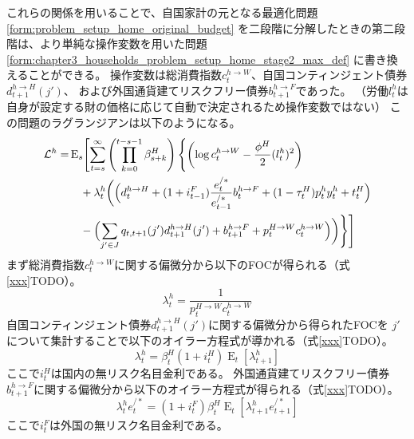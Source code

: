 これらの関係を用いることで、自国家計の元となる最適化問題
\eqref{form:problem_setup_home_original_budget}
を二段階に分解したときの第二段階は、より単純な操作変数を用いた問題
\eqref{form:chapter3_households_problem_setup_home_stage2_max_def}
に書き換えることができる。
操作変数は総消費指数\(c_t^{h\to W}\)、自国コンティンジェント債券\(d_{t+1}^{h\to H}(j')\)、
および外国通貨建てリスクフリー債券\(b_{t+1}^{h\to F}\)であった。
（労働\(l_t^h\)は自身が設定する財の価格に応じて自動で決定されるため操作変数ではない）
この問題のラグランジアンは以下のようになる。
\begin{equation}
\label{form:chapter3_households_stage2_home_lagrangian_eq}
    \begin{aligned}
        \mathcal{L}^h=&\operatorname{E}_s\Biggl[\sum_{t=s}^{\infty}\left(\prod_{k=0}^{t-s-1}\beta_{s+k}^H\right)\Biggl\{\left(\log c_t^{h\to W}-\frac{\phi^H}{2}(l_t^h)^2\right) \\
        &\quad+\lambda_t^h\biggl(\Bigl(d_t^{h\to H}+(1+i_{t-1}^F)\frac{e_t^{/*}}{e_{t-1}^{/*}}b_t^{h\to F}+(1-\tau_t^H)p_t^hy_t^h+t_t^H\Bigr) \\
        &\quad-\Bigl(\sum_{j'\in J}q_{t,t+1}(j')d_{t+1}^{h\to H}(j')+b_{t+1}^{h\to F}+p_t^{H\to W}c_t^{h\to W}\Bigr)\biggr)\Biggr\}\Biggr]
    \end{aligned}
\end{equation}
まず総消費指数\(c_t^{h\to W}\)に関する偏微分から以下のFOCが得られる（式\eqref{xxx}TODO）。
\begin{equation}
\label{form:chapter3_households_stage2_home_lambda_h_p_H_W_c_h_W_eq}
    \lambda_t^h=\frac{1}{p_t^{H\to W}c_t^{h\to W}}
\end{equation}
自国コンティンジェント債券\(d_{t+1}^{h\to H}(j')\)に関する偏微分から得られたFOCを
\(j'\)について集計することで以下のオイラー方程式が導かれる（式\eqref{xxx}TODO）。
\begin{equation}
\label{form:chapter3_households_stage2_home_lambda_h_i_H_eq}
    \lambda_t^h=\beta_t^H(1+i_t^H)\operatorname{E}_t[\lambda_{t+1}^h]
\end{equation}
ここで\(i_t^H\)は国内の無リスク名目金利である。
外国通貨建てリスクフリー債券\(b_{t+1}^{h\to F}\)に関する偏微分から以下のオイラー方程式が得られる（式\eqref{xxx}TODO）。
\begin{equation}
\label{form:chapter3_households_stage2_home_lambda_h_i_F_eq}
    \lambda_t^he_t^{/*}=(1+i_t^F)\beta_t^H\operatorname{E}_t\left[\lambda_{t+1}^he_{t+1}^{/*}\right]
\end{equation}
ここで\(i_t^F\)は外国の無リスク名目金利である。

